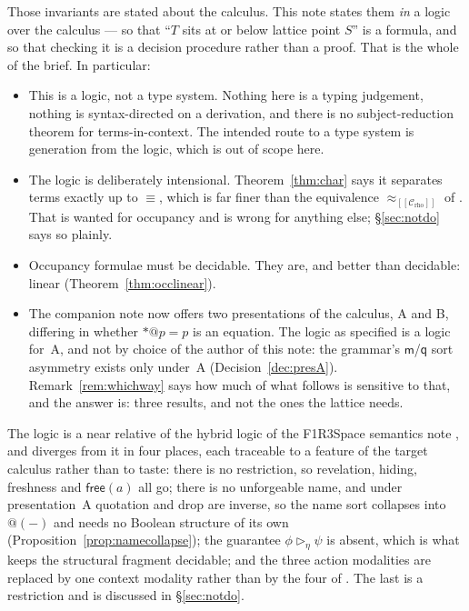 \documentclass[11pt]{article}
\makeatletter
\theoremstyle{plain}
\theoremstyle{definition}
\theoremstyle{remark}
\newcommand{\quo}[1]{@#1}
\newcommand{\drp}[1]{{*}#1}
\newcommand{\enc}[1]{[\![#1]\!]}
\newcommand{\Ctx}{\mathscr{C}}
\newcommand{\bisim}{\approx}
\newcommand{\mm}{\mathsf{m}}
\newcommand{\qq}{\mathsf{q}}
\newcommand{\scong}{\equiv}
\makeatother
\begin{document}
Those invariants are stated about the calculus. This note states them
\emph{in} a logic over the calculus --- so that ``$T$ sits at or below lattice
point $S$'' is a formula, and so that checking it is a decision procedure rather
than a proof. That is the whole of the brief. In particular:

\begin{itemize}[leftmargin=1.4em,itemsep=2pt,topsep=3pt]
\item This is a logic, not a type system. Nothing here is a typing judgement,
      nothing is syntax-directed on a derivation, and there is no subject-reduction
      theorem for terms-in-context. The intended route to a type system is
      generation from the logic, which is out of scope here.
\item The logic is deliberately intensional. Theorem~\ref{thm:char} says it
      separates terms exactly up to $\scong$, which is far finer than the
      equivalence $\bisim_{\enc{\Ctx_{\mathrm{rho}}}}$ of
      \cite[Thm.~7.9]{rhocomb3}. That is wanted for occupancy and is wrong for
      anything else; \S\ref{sec:notdo} says so plainly.
\item Occupancy formulae must be decidable. They are, and better than decidable:
      linear (Theorem~\ref{thm:occlinear}).
\item The companion note now offers two presentations of the calculus, A and
      B, differing in whether $\drp{\quo{p}} = p$ is an equation. The logic as
      specified is a logic for~A, and not by choice of the author of this note:
      the grammar's $\mm$/$\qq$ sort asymmetry exists only under~A
      (Decision~\ref{dec:presA}). Remark~\ref{rem:whichway} says how much of
      what follows is sensitive to that, and the answer is: three results, and
      not the ones the lattice needs.
\end{itemize}

The logic is a near relative of the hybrid logic of the F1R3Space semantics note
\cite{f1r3space}, and diverges from it in four places, each traceable to a
feature of the target calculus rather than to taste: there is no restriction, so
revelation, hiding, freshness and $\mathsf{free}(a)$ all go; there is no
unforgeable name, and under presentation~A quotation and drop are inverse, so
the name sort collapses into $\quo{(-)}$ and needs no Boolean structure of its
own (Proposition~\ref{prop:namecollapse}); the
guarantee $\phi \rhd_{\eta} \psi$ is absent, which is what keeps the structural
fragment decidable; and the three action modalities are replaced by one context
modality rather than by the four of \cite{softwhere}. The last is a restriction
and is discussed in \S\ref{sec:notdo}.
\end{document}

